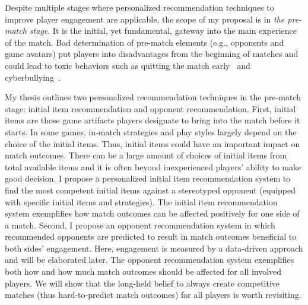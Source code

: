 

Despite multiple stages where personalized recommendation techniques to improve player engagement are applicable, the scope of my proposal is in \textit{the pre-match stage}. It is the initial, yet fundamental, gateway into the main experience of the match. Bad determination of pre-match elements (e.g., opponents and game avatars) put players into disadvantages from the beginning of matches and could lead to toxic behaviors such as quitting the match early~\cite{shores2014identification} and cyberbullying~\cite{kwak2015exploring}. 




My thesis outlines two personalized recommendation techniques in the pre-match stage: initial item recommendation and opponent recommendation. First, initial items are those game artifacts players designate to bring into the match before it starts. In some games, in-match strategies and play styles largely depend on the choice of the initial items. Thus, initial items could have an important impact on match outcomes. There can be a large amount of choices of initial items from total available items and it is often beyond inexperienced players' ability to make good decision. I propose a personalized initial item recommendation system to find the most competent initial items against a stereotyped opponent (equipped with specific initial items and strategies). The initial item recommendation system exemplifies how match outcomes can be affected positively for one side of a match. Second, I propose an opponent recommendation system in which recommended opponents are predicted to result in match outcomes beneficial to both sides' engagement. Here, engagement is measured by a data-driven approach and will be elaborated later. The opponent recommendation system exemplifies both how and how much match outcomes should be affected for all involved players. We will show that the long-held belief to always create competitive matches (thus hard-to-predict match outcomes) for all players is worth revisiting.

